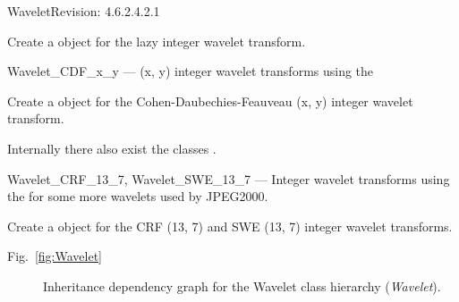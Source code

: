 \begin{manpage}{\libtitle}{Wavelet}{$ $Revision: 4.6.2.4.2.1 $ $}
\subtitle{Declaration}

    Create a  object for the lazy integer wavelet transform.


\separator

\subtitle{Name}
    Wavelet\_CDF\_x\_y ---  (x, y) integer
			   wavelet transforms using the 


\subtitle{Declaration}

    Create a  object for the Cohen-Daubechies-Feauveau (x, y)
    integer wavelet transform.


\subtitle{Note}
    Internally there also exist the classes .


\separator

\subtitle{Name}
    Wavelet\_CRF\_13\_7, Wavelet\_SWE\_13\_7  --- Integer wavelet transforms
						  using the  for some more
						  wavelets used by JPEG2000.


\subtitle{Declaration}

    Create a  object for the CRF (13, 7) and SWE (13, 7) integer
    wavelet transforms.


\separator

\subtitle{Dependency \\ Graphs}
    \begin{description}
    \item[Fig.~\ref{fig:Wavelet}] Inheritance dependency graph for the Wavelet
    class hierarchy (\emph{Wavelet}).
    \end{description}


\end{manpage}
